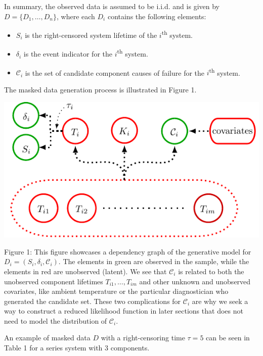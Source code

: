 \documentclass[
]{article}
\providecommand{\tightlist}{%
  \setlength{\itemsep}{0pt}\setlength{\parskip}{0pt}}
\theoremstyle{definition}
\theoremstyle{plain}
\theoremstyle{definition}
\theoremstyle{definition}
\theoremstyle{definition}
\theoremstyle{definition}
\theoremstyle{remark}
\begin{document}
In summary, the observed data is assumed to be i.i.d. and is given by
\(D = \{D_1, \ldots, D_n\}\), where each \(D_i\) contains the following elements:

\begin{itemize}
\tightlist
\item
  \(S_i\) is the right-censored system lifetime of the \(i\)\textsuperscript{th} system.
\item
  \(\delta_i\) is the event indicator for the \(i\)\textsuperscript{th} system.
\item
  \(\mathcal{C}_i\) is the set of candidate component causes of failure for the
  \(i\)\textsuperscript{th} system.
\end{itemize}

The masked data generation process is illustrated in Figure 1.

\includegraphics{./image/dep_model_standalone.pdf}

Figure 1: This figure showcases a dependency graph of the generative model for \(D_i = (S_i, \delta_i, \mathcal{C}_i)\). The elements in green are observed in the sample, while the elements in red are unobserved (latent). We see that \(\mathcal{C}_i\) is related to both the unobserved component lifetimes \(T_{i1},\ldots,T_{im}\) and other unknown and unobserved covariates, like ambient temperature or the particular diagnostician who generated the candidate set. These two complications for \(\mathcal{C}_i\) are why we seek a way to construct a reduced likelihood function in later sections that does not need to model the distribution of \(\mathcal{C}_i\).

An example of masked data \(D\) with a right-censoring time \(\tau = 5\) can be seen in Table 1
for a series system with \(3\) components.
\end{document}
